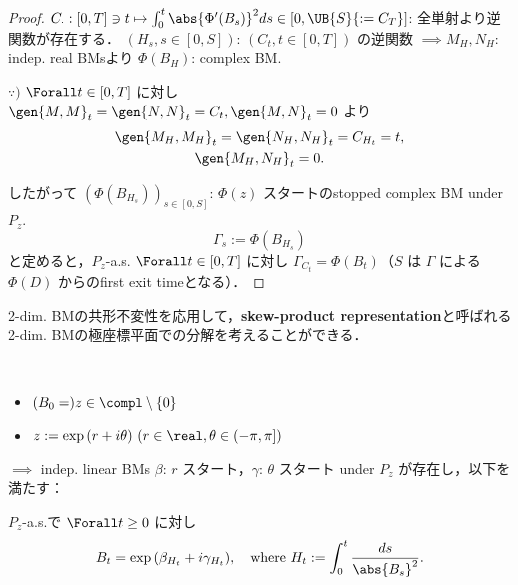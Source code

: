 \documentclass{jsarticle}
\begin{document}
\begin{proof}
    $C_{\cdot}: [0, T]\ni t\mapsto\int_0^t\abs{\Phi'(B_s)}^2ds\in[0, \UB{S}{:=C_T}]$: 全単射より逆関数が存在する．
    $(H_s, s\in [0, S])$: $(C_t, t\in [0, T])$ の逆関数
    $\implies M_H, N_H$: indep. real BMsより $\Phi(B_H)$: complex BM.

    \begin{screen}
        $\because)$
        $\Forall t\in [0, T]$ に対し $\gen{M, M}_t=\gen{N, N}_t=C_t, \gen{M, N}_t=0$ より
        \begin{gather}
            \gen{M_{H}, M_{H}}_t
            = \gen{N_{H}, N_{H}}_t
            = C_{H_t}
            = t, \\
            \gen{M_{H}, N_{H}}_t = 0.
        \end{gather}
    \end{screen}

    したがって $(\Phi(B_{H_s}))_{s\in [0, S]}$: $\Phi(z)$ スタートのstopped complex BM under $P_z$.
    $$
    \Gamma_s
    := \Phi(B_{H_s})
    $$
    と定めると，$P_z$-a.s. $\Forall t\in [0, T]$ に対し $\Gamma_{C_t}=\Phi(B_t)$（$S$ は $\Gamma$ による $\Phi(D)$ からのfirst exit timeとなる）．
\end{proof}

2-dim. BMの共形不変性を応用して，\textbf{skew-product representation}と呼ばれる2-dim. BMの極座標平面での分解を考えることができる．

\begin{screen}
    \begin{thm}\label{thm:719}~
        \begin{itemize}
            \item 
            $(B_0=)z\in\compl\setminus\{0\}$
            \item 
            $z:=\exp{(r+i\theta)}\ (r\in\real, \theta\in(-\pi, \pi])$
        \end{itemize}
        $\implies $ indep. linear BMs $\beta$: $r$ スタート，$\gamma$: $\theta$ スタート under $P_z$ が存在し，以下を満たす：
        
        $P_z$-a.s.で $\Forall t\ge0$ に対し
        $$
        B_t=\exp{(\beta_{H_t}+i\gamma_{H_t})},\quad
        \text{where }H_t:=\int_0^t\frac{ds}{\abs{B_s}^2}.
        $$
    \end{thm}
\end{screen}
\end{document}
